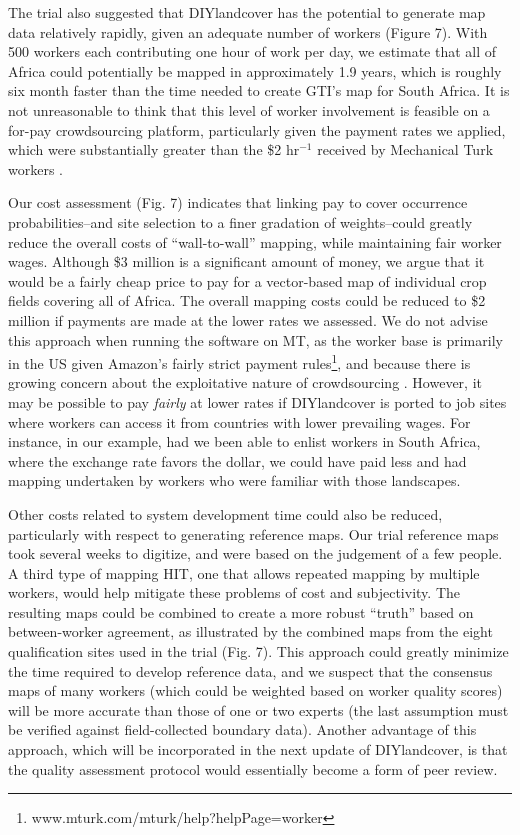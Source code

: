 \documentclass[preprint,12pt,authoryear]{elsarticle}
\begin{document}
The trial also suggested that DIYlandcover has the potential to generate map data relatively rapidly, given an adequate number of workers (Figure 7). With 500 workers each contributing one hour of work per day, we estimate that all of Africa could potentially be mapped in approximately 1.9 years, which is roughly six month faster than the time needed to create GTI's map for South Africa. It is not unreasonable to think that this level of worker involvement is feasible on a for-pay crowdsourcing platform, particularly given the payment rates we applied, which were substantially greater than the \$2 hr$^{-1}$ received by Mechanical Turk workers \citep{marvit_how_2014}. 

Our cost assessment (Fig. 7) indicates that linking pay to cover occurrence probabilities--and site selection to a finer gradation of weights--could greatly reduce the overall costs of ``wall-to-wall'' mapping, while maintaining fair worker wages. Although \$3 million is a significant amount of money, we argue that it would be a fairly cheap price to pay for a vector-based map of individual crop fields covering all of Africa. The overall mapping costs could be reduced to \$2 million if payments are made at the lower rates we assessed. We do not advise this approach when running the software on MT, as the worker base is primarily in the US given Amazon's fairly strict payment rules\footnote{www.mturk.com/mturk/help?helpPage=worker}, and because there is growing concern about the exploitative nature of crowdsourcing \citep{marvit_how_2014}. However, it may be possible to pay \emph{fairly} at lower rates if DIYlandcover is ported to job sites where workers can access it from countries with lower prevailing wages. For instance, in our example, had we been able to enlist workers in South Africa, where the exchange rate favors the dollar, we could have paid less and had mapping undertaken by workers who were familiar with those landscapes.   

Other costs related to system development time could also be reduced, particularly with respect to generating reference maps. Our trial reference maps took several weeks to digitize, and were based on the judgement of a few people. A third type of mapping HIT, one that allows repeated mapping by multiple workers, would help mitigate these problems of cost and subjectivity. The resulting maps could be combined to create a more robust ``truth'' based on between-worker agreement, as illustrated by the combined maps from the eight qualification sites used in the trial (Fig. 7). This approach could greatly minimize the time required to develop reference data, and we suspect that the consensus maps of many workers (which could be weighted based on worker quality scores) will be more accurate than those of one or two experts (the last assumption must be verified against field-collected boundary data). Another advantage of this approach, which will be incorporated in the next update of DIYlandcover, is that the quality assessment protocol would essentially become a form of peer review. 
\end{document}
